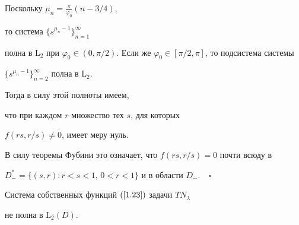 Поскольку $\mu_n={\frac{\pi}{\varphi_0}}(n-3/4)$, 


то система $\{s^{\mu_n-1}\}_{n=1}^\infty$


полна в $\mathrm{L}_2$ при $\varphi_0 


\in(0,\pi/2)$. Если же $\varphi_0 \in[\pi/2,\pi]$, то подсистема  системы 


$\{s^{\mu_n-1}\}_{n=2}^\infty$ полна в $\mathrm{L}_2$.


Тогда в силу этой полноты имеем, 


что при каждом $r$ множество тех $s$, для которых


$f(rs,r/s)\ne 0$, имеет меру нуль. 


В силу теоремы Фубини это означает, что $f(rs,r/s)=0$ почти всюду в


$D^*_-=\{(s,r):r<s<1$, $0<r<1\}$ и в области $D_-$.$\quad\square$





\begin{thm}


Система собственных функций $(\ref{1.23})$ задачи $TN_\lambda$


не полна в ${\mathrm L}_2(D)$.


\end{thm}





